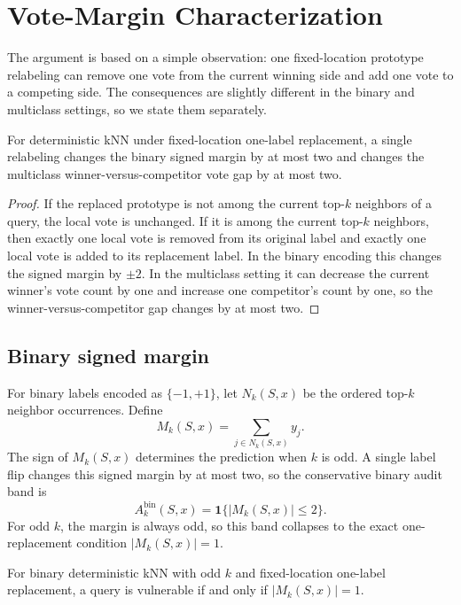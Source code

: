 \section{Vote-Margin Characterization}
\label{sec:margin-diagnostic}

The argument is based on a simple observation: one fixed-location prototype relabeling can remove one vote from the current winning side and add one vote to a competing side.  The consequences are slightly different in the binary and multiclass settings, so we state them separately.

\begin{lemma}
\label{lem:two-vote-bound}
For deterministic kNN under fixed-location one-label replacement, a single relabeling changes the binary signed margin by at most two and changes the multiclass winner-versus-competitor vote gap by at most two.
\end{lemma}

\begin{proof}
If the replaced prototype is not among the current top-$k$ neighbors of a query, the local vote is unchanged.  If it is among the current top-$k$ neighbors, then exactly one local vote is removed from its original label and exactly one local vote is added to its replacement label.  In the binary encoding this changes the signed margin by $\pm 2$.  In the multiclass setting it can decrease the current winner's vote count by one and increase one competitor's count by one, so the winner-versus-competitor gap changes by at most two.
\end{proof}

\subsection{Binary signed margin}

For binary labels encoded as $\{-1,+1\}$, let $N_k(S,x)$ be the ordered top-$k$ neighbor occurrences.  Define
\[
    M_k(S,x)=\sum_{j\in N_k(S,x)} y_j .
\]
The sign of $M_k(S,x)$ determines the prediction when $k$ is odd.  A single label flip changes this signed margin by at most two, so the conservative binary audit band is
\[
    A_k^{\mathrm{bin}}(S,x)=\mathbf 1\{|M_k(S,x)|\le 2\}.
\]
For odd $k$, the margin is always odd, so this band collapses to the exact one-replacement condition $|M_k(S,x)|=1$.

\begin{proposition}
\label{prop:binary-odd-exact}
For binary deterministic kNN with odd $k$ and fixed-location one-label replacement, a query is vulnerable if and only if $|M_k(S,x)|=1$.
\end{proposition}

